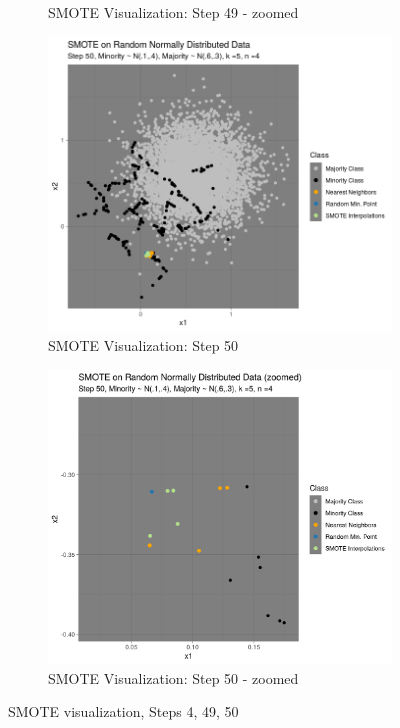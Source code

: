 \documentclass[12pt,a4paper]{article}
\begin{document}
\begin{figure}[]
\begin{subfigure}{0.48\textwidth}
\caption{SMOTE Visualization: Step 49 - zoomed} \label{fig:a}
\end{subfigure}
\medskip
\begin{subfigure}{0.48\textwidth}
\includegraphics[width=\linewidth]{./graphics/knn050.png}
\caption{SMOTE Visualization: Step 50} \label{fig:a}
\end{subfigure}\hspace*{\fill}
\begin{subfigure}{0.48\textwidth}
\includegraphics[width=\linewidth]{./graphics/knn_zoom050.png}
\caption{SMOTE Visualization: Step 50 - zoomed} \label{fig:a}
\end{subfigure}
\caption{SMOTE visualization, Steps 4, 49, 50} \label{fig:smote_vis_2}
\end{figure}
\end{document}
